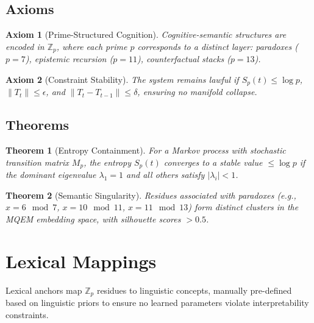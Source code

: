 \documentclass[11pt]{article}
\newtheorem{axiom}{Axiom}
\newtheorem{theorem}{Theorem}
\begin{document}
\subsection{Axioms}
\begin{axiom}[Prime-Structured Cognition]
Cognitive-semantic structures are encoded in $\mathbb{Z}_p$, where each prime $p$ corresponds to a distinct layer: paradoxes ($p=7$), epistemic recursion ($p=11$), counterfactual stacks ($p=13$).
\end{axiom}

\begin{axiom}[Constraint Stability]
The system remains lawful if $S_p(t) \leq \log p$, $\|T_t\| \leq \epsilon$, and $\|T_t - T_{t-1}\| \leq \delta$, ensuring no manifold collapse.
\end{axiom}

\subsection{Theorems}
\begin{theorem}[Entropy Containment]
For a Markov process with stochastic transition matrix $M_p$, the entropy $S_p(t)$ converges to a stable value $\leq \log p$ if the dominant eigenvalue $\lambda_1 = 1$ and all others satisfy $|\lambda_i| < 1$.
\end{theorem}

\begin{theorem}[Semantic Singularity]
Residues associated with paradoxes (e.g., $x=6 \mod 7$, $x=10 \mod 11$, $x=11 \mod 13$) form distinct clusters in the MQEM embedding space, with silhouette scores $> 0.5$.
\end{theorem}

\section{Lexical Mappings}
Lexical anchors map $\mathbb{Z}_p$ residues to linguistic concepts, manually pre-defined based on linguistic priors to ensure no learned parameters violate interpretability constraints.
\end{document}

